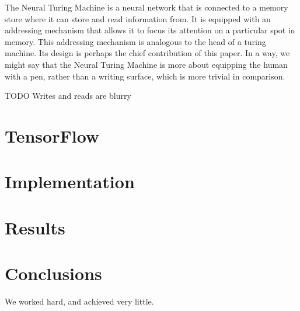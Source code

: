 \documentclass[12pt]{article}
\begin{document}
The Neural Turing Machine is a neural network that is connected to a
memory store where it can store and read information from.
It is equipped with an addressing mechanism that allows it to focus its
attention on a particular spot in memory. This addressing mechanism
is analogous to the head of a turing machine. Its design is perhaps the
chief contribution of this paper. In a way, we might say that the Neural
Turing Machine is more about equipping the human with a pen,
rather than a writing surface, which is more trivial in comparison.

TODO Writes and reads are blurry

\section{TensorFlow}\label{tensorflow}

\section{Implementation}\label{implementation}

\section{Results}\label{results}

\section{Conclusions}\label{conclusions}
We worked hard, and achieved very little.



\end{document}
